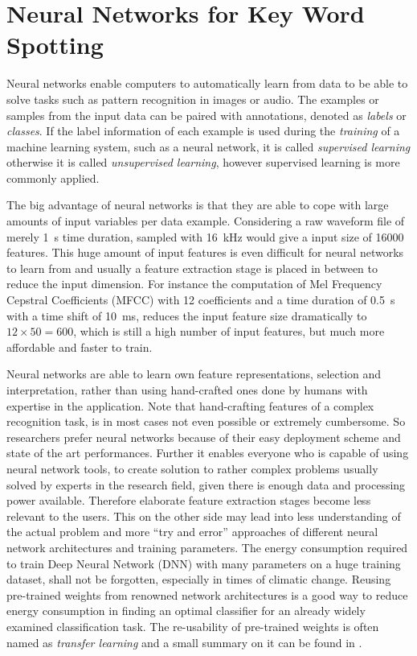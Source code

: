 
\section{Neural Networks for Key Word Spotting}\label{sec:intro_nn}
\thesisStateRevised
Neural networks enable computers to automatically learn from data to be able to solve tasks such as pattern recognition in images or audio.
The examples or samples from the input data can be paired with annotations, denoted as \emph{labels} or \emph{classes}.
If the label information of each example is used during the \emph{training} of a machine learning system, such as a neural network, it is called \emph{supervised learning} otherwise it is called \emph{unsupervised learning}, however supervised learning is more commonly applied.

The big advantage of neural networks is that they are able to cope with large amounts of input variables per data example.
Considering a raw waveform file of merely \SI{1}{s} time duration, sampled with \SI{16}{\kilo\hertz} would give a input size of 16000 features.
This huge amount of input features is even difficult for neural networks to learn from and usually a feature extraction stage is placed in between to reduce the input dimension.
For instance the computation of Mel Frequency Cepstral Coefficients (MFCC) with 12 coefficients and a time duration of \SI{0.5}{s} with a time shift of \SI{10}{\milli\second}, reduces the input feature size dramatically to $12 \times 50 = 600$, which is still a high number of input features, but much more affordable and faster to train.

Neural networks are able to learn own feature representations, selection and interpretation, rather than using hand-crafted ones done by humans with expertise in the application.
Note that hand-crafting features of a complex recognition task, is in most cases not even possible or extremely cumbersome.
So researchers prefer neural networks because of their easy deployment scheme and state of the art performances.
Further it enables everyone who is capable of using neural network tools, to create solution to rather complex problems usually solved by experts in the research field, given there is enough data and processing power available.
Therefore elaborate feature extraction stages become less relevant to the users.
This on the other side may lead into less understanding of the actual problem and more \enquote{try and error} approaches of different neural network architectures and training parameters.
The energy consumption required to train Deep Neural Network (DNN) with many parameters on a huge training dataset, shall not be forgotten, especially in times of climatic change.
Reusing pre-trained weights from renowned network architectures is a good way to reduce energy consumption in finding an optimal classifier for an already widely examined classification task.
The re-usability of pre-trained weights is often named as \emph{transfer learning} and a small summary on it can be found in \cite{TransferLearning}.


